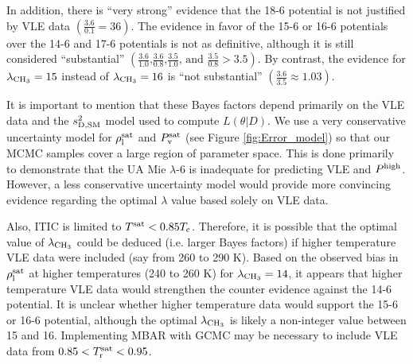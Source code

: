\documentclass[preprint,letterpaper,floatfix,citeautoscript,aip,jcp]{revtex4-1}
\begin{document}

In addition, there is ``very strong'' evidence that the 18-6 potential is not justified by VLE data $\left(\frac{3.6}{0.1} = 36\right)$. The evidence in favor of the 15-6 or 16-6 potentials over the 14-6 and 17-6 potentials is not as definitive, although it is still considered ``substantial'' $\left(\frac{3.6}{1.0} \text{,} \frac{3.6}{0.8} \text{,} \frac{3.5}{1.0} \text{, and } \frac{3.5}{0.8} > 3.5\right)$. By contrast, the evidence for $\lambda_{\rm CH_3} = 15$ instead of $\lambda_{\rm CH_3} = 16$ is ``not substantial'' $\left(\frac{3.6}{3.5} \approx 1.03\right)$.


It is important to mention that these Bayes factors depend primarily on the VLE data and the $s^2_{\rm D,SM}$ model used to compute $L(\theta|D)$. We use a very conservative uncertainty model for $\rho_{\rm l}^{\rm sat}$ and $P_{\rm v}^{\rm sat}$ (see Figure \ref{fig:Error_model}) so that our MCMC samples cover a large region of parameter space. This is done primarily to demonstrate that the UA Mie $\lambda$-6 is inadequate for predicting VLE and $P^{\rm high}$. However, a less conservative uncertainty model would provide more convincing evidence regarding the optimal $\lambda$ value based solely on VLE data. 

Also, ITIC is limited to $T^{\rm sat} < 0.85 T_{\rm c}$. Therefore, it is possible that the optimal value of $\lambda_{\rm CH_3}$ could be deduced (i.e. larger Bayes factors) if higher temperature VLE data were included (say from 260 to 290 K). Based on the observed bias in $\rho_{\rm l}^{\rm sat}$ at higher temperatures (240 to 260 K) for $\lambda_{\rm CH_3} = 14$, it appears that higher temperature VLE data would strengthen the counter evidence against the 14-6 potential. It is unclear whether higher temperature data would support the 15-6 or 16-6 potential, although the optimal $\lambda_{\rm CH_3}$ is likely a non-integer value between 15 and 16. 
Implementing MBAR with GCMC may be necessary to include VLE data from $0.85 < T_{\rm r}^{\rm sat} < 0.95$.
\end{document}
